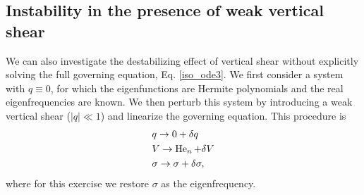 
\subsection{Instability in the presence of weak vertical shear}
We can also investigate the destabilizing effect of vertical shear
without explicitly solving the full governing equation,
Eq. \ref{iso_ode3}. We first
consider a system with $q\equiv0$, for which the eigenfunctions are
Hermite polynomials and the real eigenfrequencies are known. We then
perturb this system by introducing a weak vertical shear ($|q|\ll1$)
and linearize the governing equation. This procedure is
\begin{align}   
  &q \to 0 + \delta q\\
  &V \to \operatorname{He}_n + \delta V \\
  &\sigma \to \sigma + \delta\sigma, 
\end{align}
where for this exercise we restore $\sigma$ as the eigenfrequency. 

